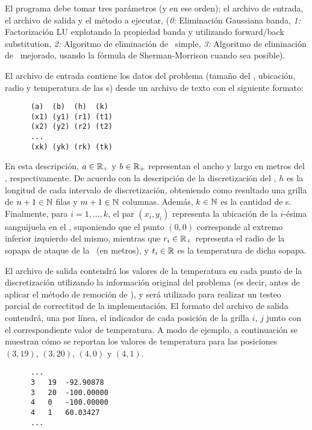 El programa debe tomar tres par\'ametros (y en ese orden): el archivo de entrada, el archivo de salida y el m\'etodo a ejecutar, (\emph{0:} Eliminaci\'on Gaussiana banda, \emph{1:} Factorizaci\'on LU explotando la propiedad banda y utilizando forward/back substitution, \emph{2:} Algoritmo de eliminaci\'on de \atacante\ simple, \emph{3:} Algoritmo de eliminaci\'on de \atacante\ mejorado, usando la f\'ormula de Sherman-Morrison cuando sea posible).

El archivo de entrada contiene los datos del problema (tama\~no del \objeto, ubicaci\'on, radio y temperatura de las \atacante s) desde un archivo de texto con el siguiente formato:

\begin{verbatim}
      (a)  (b)  (h)  (k)
      (x1) (y1) (r1) (t1)
      (x2) (y2) (r2) (t2)
      ...
      (xk) (yk) (rk) (tk)
\end{verbatim}

En esta descripci\'on, $a\in\mathbb{R}_+$ y $b\in\mathbb{R}_+$ representan el ancho
y largo en metros del \objeto, respectivamente. De acuerdo con la descripci\'on
de la discretizaci\'on del \objeto, $h$ es la longitud de cada intervalo de discretizaci\'on,
obteniendo como resultado una grilla de $n+1\in\mathbb{N}$ filas y $m+1\in\mathbb{N}$ columnas. Adem\'as, $k\in\mathbb{N}$ es la cantidad de \atacante s.
Finalmente, para $i=1,\dots,k$, el par $(x_i,y_i)$ representa la ubicaci\'on de la $i$-\'esima sanguijuela en el \objeto, suponiendo que el punto $(0,0)$  corresponde al extremo inferior izquierdo del mismo, mientras que $r_i\in\mathbb{R}_+$ representa el radio de la sopapa de ataque de la \atacante\ (en metros), y $t_i\in\mathbb{R}$ es la temperatura de dicha sopapa.

El archivo de salida contendr\'a los valores de la temperatura en cada punto de la discretizaci\'on utilizando la informaci\'on original del problema (es decir, antes de aplicar el m\'etodo de remoci\'on de \atacante), y ser\'a utilizado para realizar un testeo parcial de correctitud de la implementaci\'on. El formato del archivo de salida contendr\'a, una por l\'inea, el indicador de cada posici\'on de la grilla $i$, $j$ junto con el correspondiente valor de temperatura. A modo de ejemplo, a continuaci\'on se muestran c\'omo se reportan los valores de temperatura para las posiciones $(3,19)$, $(3,20)$, $(4,0)$ y $(4,1)$. 

\begin{verbatim}
      ...
      3   19  -92.90878
      3   20  -100.00000
      4   0   -100.00000
      4   1   60.03427
      ...
\end{verbatim}

